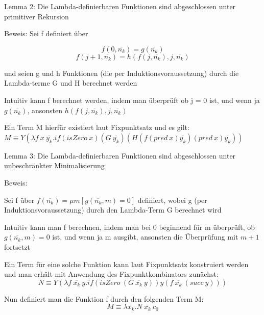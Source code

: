 \documentclass[10pt]{article}
\begin{document}
  \begin{itemize*}
    \item  \color{blue} Lemma 2: Die Lambda-definierbaren Funktionen sind abgeschlossen unter primitiver Rekursion \color{black}
    \item Beweis: Sei f definiert über
    \begin{center}
      $$f(0,\overline{n_k}) = g(\overline{n_k})$$
      $$f(j+1, \overline{n_k}) = h(f(j, \overline{n_k}),j,\overline{n_k})$$
    \end{center}
    und seien g und h Funktionen (die per Induktionsvoraussetzung) durch die Lambda-terme G und H berechnet werden
    \begin{itemize*}
      \item Intuitiv kann f berechnet werden, indem man überprüft ob j = 0 ist, und wenn ja $g(\overline{n_k})$, ansonsten $h(f(j, \overline{n_k}),j,\overline{n_k})$
      \item Ein Term M hierfür existiert laut Fixpunktsatz und es gilt:
      $M \equiv Y (\lambda f\:x\: \overline{y_k}.if(isZero \: x)(G\:\overline{y_k})(H(f(pred\: x)\overline{y_k})(pred \: x)\overline{y_k}))$
    \end{itemize*}
  \end{itemize*}
  
  \begin{itemize*}
    \item \color{blue} Lemma 3: Die Lambda-definierbaren Funktionen sind abgeschlossen unter unbeschränkter Minimalisierung \color{black}
    \item Beweis:
    \begin{itemize*}
      \item Sei f über $f(\overline{n_k}) = \mu m[g(\overline{n_k},m) = 0]$ definiert, wobei g (per Induktionsvoraussetzung) durch den Lambda-Term G berechnet wird
      \item Intuitiv kann man f berechnen, indem man bei 0 beginnend für m überprüft, ob $g(\overline{n_k},m) = 0$ ist, und wenn ja m ausgibt, ansonsten die Überprüfung mit $m+1$ fortsetzt
      \item Ein Term für eine solche Funktion kann laut Fixpunktsatz konstruiert werden und man erhält mit Anwendung des Fixpunktkombinators zunächst: $$N \equiv Y (\lambda f \: \overline{x_k} \: y. if(isZero \: (G \: \overline{x_k} \: y))y(f\:\overline{x_k}\:(succ \: y)))$$
      \item Nun definiert man die Funktion f durch den folgenden Term M: $$M \equiv \lambda \overline{x_k}.N \: \overline{x_k} \: c_0$$
    \end{itemize*}
  \end{itemize*}
  
\end{document}

